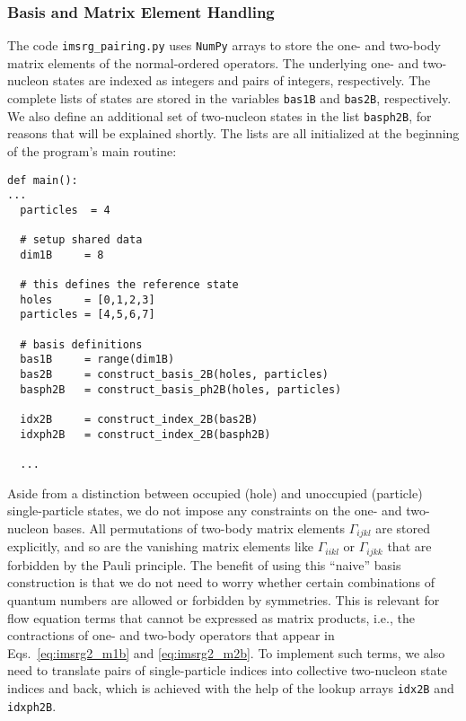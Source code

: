 \subsubsection*{Basis and Matrix Element Handling}
The code \texttt{imsrg\_pairing.py} uses \texttt{NumPy} arrays to store
the one- and two-body matrix elements of the normal-ordered operators.
The underlying one- and two-nucleon states are indexed as integers and
pairs of integers, respectively. The complete lists of states are stored
in the variables \texttt{bas1B} and \texttt{bas2B}, respectively. We
also define an additional set of two-nucleon states in the list \texttt{basph2B},
for reasons that will be explained shortly. The lists are all initialized
at the beginning of the program's main routine:
\begin{lstlisting}
def main():
...
  particles  = 4

  # setup shared data
  dim1B     = 8

  # this defines the reference state
  holes     = [0,1,2,3]
  particles = [4,5,6,7]

  # basis definitions
  bas1B     = range(dim1B)
  bas2B     = construct_basis_2B(holes, particles)
  basph2B   = construct_basis_ph2B(holes, particles)

  idx2B     = construct_index_2B(bas2B)
  idxph2B   = construct_index_2B(basph2B)

  ...
\end{lstlisting}
Aside from a distinction between occupied (hole) and unoccupied (particle)
single-particle states, we do not impose any constraints on the one- and
two-nucleon bases. All permutations of two-body matrix elements $\Gamma_{ijkl}$
are stored explicitly, and so are the vanishing matrix elements like 
$\Gamma_{iikl}$ or $\Gamma_{ijkk}$ that are forbidden by the Pauli principle.
The benefit of using this ``naive'' basis construction is that we do not need
to worry whether certain combinations of quantum numbers are allowed or 
forbidden by symmetries. This is relevant for flow equation terms that cannot 
be expressed as matrix products, i.e., the contractions of one- and two-body 
operators that appear in Eqs.~\eqref{eq:imsrg2_m1b} and \eqref{eq:imsrg2_m2b}. 
To implement such terms, we also need to translate pairs of single-particle 
indices into collective two-nucleon state indices and back, which is achieved 
with the help of the lookup arrays \texttt{idx2B} and \texttt{idxph2B}.

